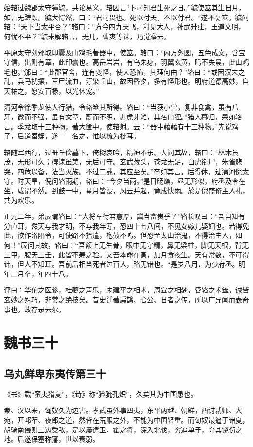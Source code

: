 \documentclass[12pt,UTF8]{ctexbook}
\begin{document}
始辂过魏郡太守锺毓，共论易义，辂因言“卜可知君生死之日。”毓使筮其生日月，如言无蹉跌。毓大愕然，曰：“君可畏也。死以付天，不以付君。“遂不复筮。毓问辂：“天下当太平否？”辂曰：“方今四九天飞，利见大人，神武升建，王道文明，何忧不平？”毓未解辂言，无几，曹爽等诛，乃觉寤云。

平原太守刘邠取印囊及山鸡毛著器中，使筮。辂曰：“内方外圆，五色成文，含宝守信，出则有章，此印囊也。高岳岩岩，有鸟朱身，羽翼玄黄，鸣不失晨，此山鸡毛也。”邠曰：“此郡官舍，连有变怪，使人恐怖，其理何由？”辂曰：“或因汉末之乱，兵马扰攘，军尸流血，汙染丘山，故因昬夕，多有怪形也。明府道德高妙，自天祐之，愿安百禄，以光休宠。”

清河令徐季龙使人行猎，令辂筮其所得。辂曰：“当获小兽，复非食禽，虽有爪牙，微而不强，虽有文章，蔚而不明，非虎非雉，其名曰狸。”猎人暮归，果如辂言。季龙取十三种物，著大箧中，使辂射。云：“器中藉藉有十三种物。”先说鸡子，后道蚕蛹，遂一一名之，惟以梳为枇耳。

辂随军西行，过毌丘俭墓下，倚树哀吟，精神不乐。人问其故，辂曰：“林木虽茂，无形可久；碑诔虽美，无后可守。玄武藏头，苍龙无足，白虎衔尸，朱雀悲哭，四危以备，法当灭族。不过二载，其应至矣。”卒如其言。后得休，过清河倪太守。时天旱，倪问辂雨期，辂曰：“今夕当雨。”是日旸燥，昼无形似，府丞及令在坐，咸谓不然。到鼓一中，星月皆没，风云并起，竟成快雨。於是倪盛脩主人礼，共为欢乐。

正元二年，弟辰谓辂曰：“大将军待君意厚，冀当富贵乎？”辂长叹曰：“吾自知有分直耳，然天与我才明，不与我年寿，恐四十七八间，不见女嫁儿娶妇也。若得免此，欲作洛阳令，可使路不拾遣，枹鼓不鸣。但恐至太山治鬼，不得治生人，如何！”辰问其故，辂曰：“吾额上无生骨，眼中无守精，鼻无梁柱，脚无天根，背无三甲，腹无三壬，此皆不寿之验。又吾本命在寅，加月食夜生。天有常数，不可得讳，但人不知耳。吾前后相当死者过百人，略无错也。“是岁八月，为少府丞。明年二月卒，年四十八。

评曰：华佗之医诊，杜夔之声乐，朱建平之相术，周宣之相梦，管辂之术筮，诚皆玄妙之殊巧，非常之绝技矣。昔史迁著扁鹊、仓公、日者之传，所以广异闻而表奇事也。故存录云尔。

\part{魏书三十}
\chapter{乌丸鲜卑东夷传第三十}

《书》载“蛮夷猾夏”，《诗》称“猃狁孔炽”，久矣其为中国患也。

秦、汉以来，匈奴久为边害。孝武虽外事四夷，东平两越、朝鲜，西讨贰师、大宛，开邛苲、夜郎之道，然皆在荒服之外，不能为中国轻重。而匈奴最逼于诸夏，胡骑南侵则三边受敌，是以屡遣卫、霍之将，深入北伐，穷追单于，夺其饶衍之地。后遂保塞称藩，世以衰弱。
\end{document}
